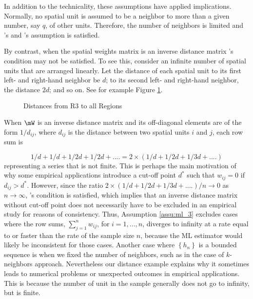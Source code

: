 \documentclass[english,12pt]{book}\usepackage[]{graphicx}\usepackage[]{xcolor}
\begin{document}
In addition to the technicality, these assumptions have applied implications. Normally, no spatial unit is assumed to be a neighbor to more than a given number, say $q$, of other units. Therefore, the number of neighbors is limited and \cite{lee2004asymptotic}'s and  \cite{kelejian1998generalized, kelejian1999generalized}'s assumption is satisfied. 

By contrast, when the spatial weights matrix is an inverse distance matrix \cite{kelejian1998generalized, kelejian1999generalized}'s condition may not be satisfied. To see this, consider an infinite number of spatial units that are arranged linearly. Let the distance of each spatial unit to its first left- and right-hand neighbor be $d$; to its second left- and right-hand neighbor, the distance $2d$; and so on. See for example Figure \ref{fig:example_lineal}.

\begin{figure}[h]
\caption{Distances from R3 to all Regions}
\label{fig:example_lineal}
\centering
{}
\end{figure}


When $\mW$ is an inverse distance matrix and its off-diagonal elements are of the form $1/d_{ij}$, where $d_{ij}$ is the distance between two spatial units $i$ and $j$, each row sum is

\begin{equation*}
  1/d + 1/d + 1/2d + 1/2d + .... = 2 \times (1/d + 1/2d + 1/3d + ....) 
\end{equation*}
%
representing a series that is not finite. This is perhaps the main motivation of why some empirical applications introduce a cut-off point $d^*$ such that $w_{ij}=0$ if $d_{ij}>d^*$. However, since the ratio $2 \times (1/d + 1/2d + 1/3d + ....)/ n \to 0$ as $n\to \infty$,  \cite{lee2004asymptotic}'s condition is satisfied, which implies that an inverse distance matrix without cut-off point does not necessarily have to be excluded in an empirical study for reasons of consistency. Thus, Assumption \ref{assu:ml_3} excludes cases where the row sums, $\sum_{j = 1}^n w_{ij}$, for $i = 1,...,n$, diverges to infinity at a rate equal to or faster than the rate of the sample size $n$, because the ML estimator would likely be inconsistent for those cases. Another case where $\left\lbrace h_n \right\rbrace$ is a bounded sequence is when we fixed the number of neighbors, such as in the case of $k$-neighbors approach. Nevertheless our distance example explains why it sometimes leads to numerical problems or unexpected outcomes in empirical applications. This is because the number of unit in the sample generally does not go to infinity, but is finite. 
\end{document}
